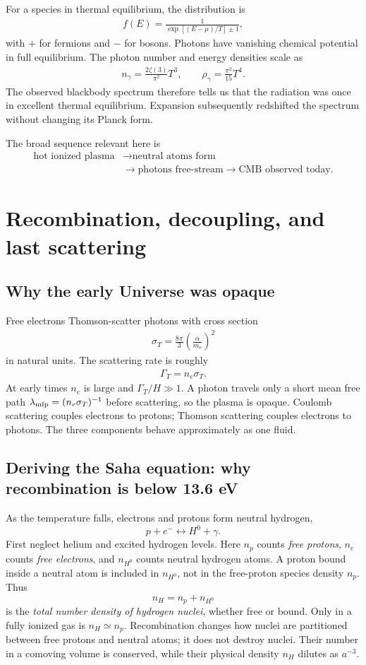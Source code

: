 \documentclass[12pt]{article}
\newcommand{\be}{\begin{eqnarray}}
\newcommand{\ee}{\end{eqnarray}}
\begin{document}
For a species in thermal equilibrium, the distribution is
\be
f(E)=\frac{1}{\exp[(E-\mu)/T]\pm1},
\ee
with $+$ for fermions and $-$ for bosons. Photons have vanishing chemical potential
in full equilibrium. The photon number and energy densities scale as
\be
n_\gamma=\frac{2\zeta(3)}{\pi^2}T^3,
\qquad \rho_\gamma=\frac{\pi^2}{15}T^4.
\ee
The observed blackbody spectrum therefore tells us that the radiation was once in
excellent thermal equilibrium. Expansion subsequently redshifted the spectrum without
changing its Planck form.

The broad sequence relevant here is
\[
\begin{split}
\text{hot ionized plasma}&\longrightarrow\text{neutral atoms form}\\
&\longrightarrow\text{photons free-stream}\longrightarrow\text{CMB observed today}.
\end{split}
\]

\section{Recombination, decoupling, and last scattering}

\subsection{Why the early Universe was opaque}
Free electrons Thomson-scatter photons with cross section
\be
\sigma_T=\frac{8\pi}{3}\left(\frac{\alpha}{m_e}\right)^2
\ee
in natural units. The scattering rate is roughly
\be
\Gamma_T=n_e\sigma_T.
\ee
At early times $n_e$ is large and $\Gamma_T/H\gg1$. A photon travels only a short
mean free path $\lambda_{\rm mfp}=(n_e\sigma_T)^{-1}$ before scattering, so the plasma
is opaque. Coulomb scattering couples electrons to protons; Thomson scattering couples
electrons to photons. The three components behave approximately as one fluid.

\subsection{Deriving the Saha equation: why recombination is below 13.6 eV}
As the temperature falls, electrons and protons form neutral hydrogen,
\[
p+e^-\leftrightarrow H^0+\gamma.
\]
First neglect helium and excited hydrogen levels. Here $n_p$ counts
\emph{free protons}, $n_e$ counts \emph{free electrons}, and $n_{H^0}$ counts
neutral hydrogen atoms. A proton bound inside a neutral atom is included in
$n_{H^0}$, not in the free-proton species density $n_p$. Thus
\[
n_H=n_p+n_{H^0}
\]
is the \emph{total number density of hydrogen nuclei}, whether free or bound.
Only in a fully ionized gas is $n_H\simeq n_p$. Recombination changes how nuclei
are partitioned between free protons and neutral atoms; it does not destroy
nuclei. Their number in a comoving volume is conserved, while their physical
density $n_H$ dilutes as $a^{-3}$.
\end{document}
